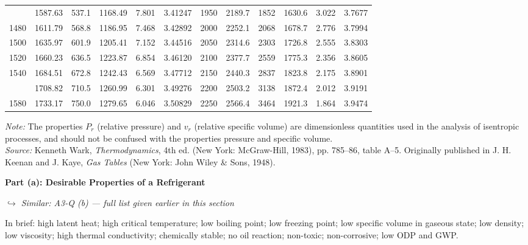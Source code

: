 \documentclass[12pt,a3paper]{article}
\newcommand{\variant}[1]{\par\vspace{1pt}\textcolor{blue!50!black}%
  {\footnotesize\textit{$\hookrightarrow$ Similar: #1}}}
\begin{document}
\begin{enumerate}
\begin{center}
\begin{longtable}{cccccc|cccccc}
\addlinespace
1460 & 1587.63 & 537.1 & 1168.49 & 7.801 & 3.41247 & 1950 & 2189.7 & 1852 & 1630.6 & 3.022 & 3.7677 \\
1480 & 1611.79 & 568.8 & 1186.95 & 7.468 & 3.42892 & 2000 & 2252.1 & 2068 & 1678.7 & 2.776 & 3.7994 \\
1500 & 1635.97 & 601.9 & 1205.41 & 7.152 & 3.44516 & 2050 & 2314.6 & 2303 & 1726.8 & 2.555 & 3.8303 \\
1520 & 1660.23 & 636.5 & 1223.87 & 6.854 & 3.46120 & 2100 & 2377.7 & 2559 & 1775.3 & 2.356 & 3.8605 \\
1540 & 1684.51 & 672.8 & 1242.43 & 6.569 & 3.47712 & 2150 & 2440.3 & 2837 & 1823.8 & 2.175 & 3.8901 \\
\addlinespace
1560 & 1708.82 & 710.5 & 1260.99 & 6.301 & 3.49276 & 2200 & 2503.2 & 3138 & 1872.4 & 2.012 & 3.9191 \\
1580 & 1733.17 & 750.0 & 1279.65 & 6.046 & 3.50829 & 2250 & 2566.4 & 3464 & 1921.3 & 1.864 & 3.9474 \\
\end{longtable}
\end{center}

\vspace{0.1cm}
\noindent\footnotesize \textit{Note:} The properties $P_r$ (relative pressure) and $v_r$ (relative specific volume) are dimensionless quantities used in the analysis of isentropic processes, and should not be confused with the properties pressure and specific volume. \\
\textit{Source:} Kenneth Wark, \textit{Thermodynamics}, 4th ed. (New York: McGraw-Hill, 1983), pp. 785--86, table A--5. Originally published in J. H. Keenan and J. Kaye, \textit{Gas Tables} (New York: John Wiley \& Sons, 1948).


\begin{tcolorbox}[enhanced,breakable,ansbox,colback=cC!4,colframe=cC,
  boxrule=0.8pt,arc=5pt,
  title={\textbf{Solution}},fonttitle=\bfseries\color{white},colbacktitle=cC]

\textbf{Part (a): Desirable Properties of a Refrigerant}

\variant{A3-Q (b) — full list given earlier in this section}

In brief: high latent heat; high critical temperature; low boiling point;
low freezing point; low specific volume in gaseous state; low density; low
viscosity; high thermal conductivity; chemically stable; no oil reaction;
non-toxic; non-corrosive; low ODP and GWP.

\hrulefill


\end{tcolorbox}
\end{enumerate}
\end{document}
